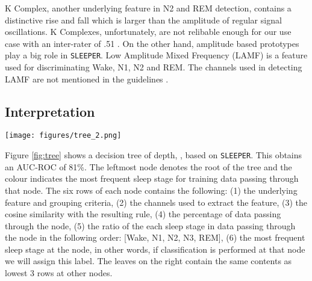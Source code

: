 \documentclass[pmlr]{jmlr}
\newcommand{\mname}
{\texttt{SLEEPER}\xspace}
\begin{document}
K Complex, another underlying feature in N2 and REM detection, contains a distinctive rise and fall which is larger than the amplitude of regular signal oscillations. K Complexes, unfortunately, are not relibable enough for our use case with an inter-rater  of .51 \citep{kcomplexkappa}. On the other hand, amplitude based prototypes play a big role in \mname. Low Amplitude Mixed Frequency (LAMF) is a feature used for discriminating Wake, N1, N2 and REM. The channels used in detecting LAMF are not mentioned in the guidelines \citep{berry2012aasm}. 




\subsection{Interpretation} \label{sec:interpretation}

\begin{figure*}[htb]
 \begin{minipage}{\textwidth}
    \centering
    \texttt{[image: figures/tree\_2.png]}
    \caption[tmp LOF]{\mname-Decision Tree trained from the ISRUC dataset {\let\thefootnote\relax{}}} 
    \label{fig:tree}
\end{minipage}
\end{figure*}
Figure \ref{fig:tree} shows a decision tree of depth, , based on \mname. This obtains an AUC-ROC of 81\%. The leftmost node denotes the root of the tree and the colour indicates the most frequent sleep stage for training data passing through that node. The six rows of each node contains the following: (1) the underlying feature and grouping criteria, (2) the channels used to extract the feature, (3) the cosine similarity with the resulting rule, (4) the percentage of data passing through the node, (5) the ratio of the each sleep stage in data passing through the node in the following order: [Wake, N1, N2, N3, REM], (6) the most frequent sleep stage at the node, in other words, if classification is performed at that node we will assign this label. The leaves on the right contain the same contents as lowest 3 rows at other nodes. 
\end{document}
